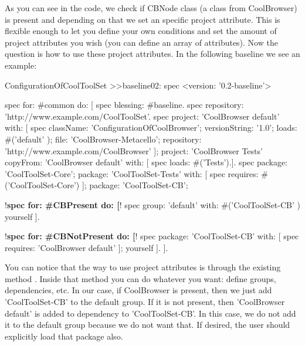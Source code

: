 \documentclass[a4paper,10pt,twoside]{book}
\begin{document}
As you can see in the code, we check if CBNode class (a class from CoolBrowser) is present and depending on that we set an specific project attribute.
This is flexible enough to let you define your own conditions and set the amount of project attributes you wish (you can define an array of attributes).  
Now the question is how to use these project attributes. In the following baseline we see an example:

\begin{code}{}
ConfigurationOfCoolToolSet >>baseline02: spec 
       <version: '0.2-baseline'>
       
       spec for: #common do: [
              spec blessing: #baseline.
              spec repository: 'http://www.example.com/CoolToolSet'.
              spec project: 'CoolBrowser default' with: [
                            spec
                                   className: 'ConfigurationOfCoolBrowser';
                                   versionString: '1.0';
                                   loads: #('default' );
                                   file: 'CoolBrowser-Metacello';
                                   repository: 'http://www.example.com/CoolBrowser' ];
                     project: 'CoolBrowser Tests' 
                            copyFrom: 'CoolBrowser default' 
                            with: [ spec loads: #('Tests').].
              spec 
                     package: 'CoolToolSet-Core';
                     package: 'CoolToolSet-Tests' with: [ 
                            spec requires: #('CoolToolSet-Core') ];
                     package: 'CoolToolSet-CB';       
                     
             !\textbf{spec for: \#CBPresent do: [}!   
                     spec
                            group: 'default' with: #('CoolToolSet-CB' )
                            yourself ].
              
             !\textbf{spec for: \#CBNotPresent do: [}!                 
                     spec 
                            package: 'CoolToolSet-CB' with: [ spec requires: 'CoolBrowser default' ];
                            yourself ].
                     ].
              
\end{code}

You can notice that the way to use project attributes is through the existing method . Inside that method you can do whatever you want: define groups, dependencies, etc. In our case, if CoolBrowser is present, then we just add 'CoolToolSet-CB' to the default group. If it is not present, then 'CoolBrowser default' is added to dependency to 'CoolToolSet-CB'. In this case, we do not add it to the default group because we do not want that. If desired, the user should explicitly load that package also. 
\end{document}
